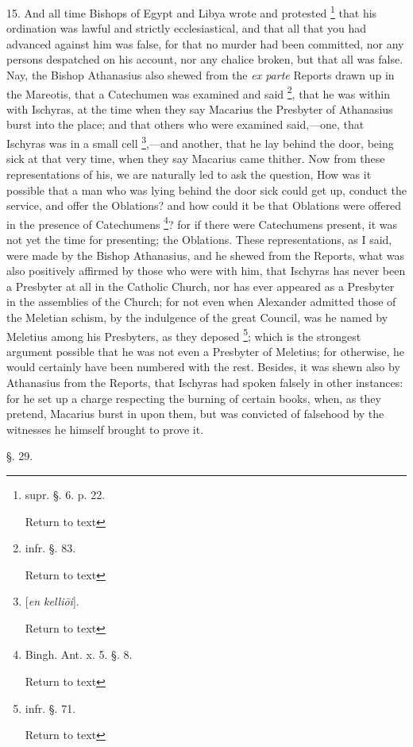 15. And all time Bishops of Egypt and Libya wrote
and protested \footnote{supr. §. 6. p. 22.

Return to text} that
his ordination was lawful and strictly ecclesiastical, and that all
that you had advanced against him was false, for that no murder had
been committed, nor any persons despatched on his account, nor any
chalice broken, but that all was false. Nay, the Bishop Athanasius
also shewed from the \emph{ex parte} Reports drawn up in the Mareotis,
that a Catechumen was examined and said \footnote{infr. §. 83.

Return to text}, that he was within with Ischyras, at the time when they say
Macarius the Presbyter of Athanasius burst into the place; and that
others who were examined said,—one, that Ischyras was in a small
cell \footnote{[\emph{en kelli\={o}i}].

Return to text},—and another,
that he lay behind the door, being sick at that very time, when
they say Macarius came thither. Now from these representations of his,
we are naturally led to ask the question, How was it possible that a
man who was lying behind the door sick could get up, conduct the
service, and offer the Oblations? and how could it be that Oblations
were offered in the presence of Catechumens \footnote{Bingh. Ant. x. 5. §. 8.

Return to text}? for if there were Catechumens present, it was not yet the
time for presenting; the Oblations. These representations, as I said,
were made by the Bishop Athanasius, and he shewed from the Reports,
what was also positively affirmed by those who were with him, that
Ischyras has never been a Presbyter at all in the Catholic Church, nor
has ever appeared as a Presbyter in the assemblies of the Church; for
not even when Alexander admitted those of the Meletian schism, by the
indulgence of the great Council, was he named by Meletius among his
Presbyters, as they deposed \footnote{infr. §. 71.

Return to text}; which is the strongest argument possible that he was not even
a Presbyter of Meletius; for otherwise, he would certainly have been
numbered with the rest. Besides, it was shewn also by Athanasius from
the Reports, that Ischyras had spoken falsely in other instances: for
he set up a charge respecting the burning of certain books, when, as
they pretend, Macarius burst in upon them, but was convicted of
falsehood by the witnesses he himself brought to prove it.

§. 29.

